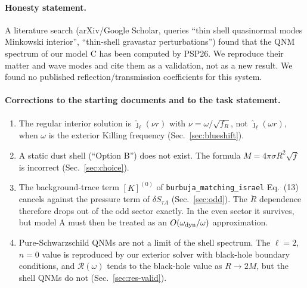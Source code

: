 \documentclass[11pt,a4paper]{article}
\numberwithin{equation}{section}
\newcommand{\sq}{\sqrt{f_R}}
\newcommand{\jh}{\hat\jmath_\ell}
\begin{document}
\paragraph{Honesty statement.} A literature search (arXiv/Google Scholar, queries ``thin shell
quasinormal modes Minkowski interior'', ``thin-shell gravastar perturbations'') found that the QNM spectrum
of our model C has been computed by PSP26. We reproduce their matter and wave modes and cite them as a
validation, not as a new result. We found no published reflection/transmission coefficients for this
system.

\paragraph{Corrections to the starting documents and to the task statement.}
\begin{enumerate}
\item The regular interior solution is $\jh(\nu r)$ with $\nu=\omega/\sq$, not $\jh(\omega r)$, when $\omega$
  is the exterior Killing frequency (Sec.~\ref{sec:blueshift}).
\item A static dust shell (``Option B'') does not exist. The formula $M=4\pi\sigma R^2\sqrt f$ is incorrect
  (Sec.~\ref{sec:choice}).
\item The background-trace term $[K]^{(0)}$ of \texttt{burbuja\_matching\_israel} Eq.~(13) cancels against the
  pressure term of $\delta S_{\tau A}$ (Sec.~\ref{sec:odd}). The $\ddot R$ dependence therefore drops out of the
  odd sector exactly. In the even sector it survives, but model A must then be treated as an
  $O(\omega_{\rm dyn}/\omega)$ approximation.
\item Pure-Schwarzschild QNMs are not a limit of the shell spectrum. The $\ell=2$, $n=0$ value is reproduced by
  our exterior solver with black-hole boundary conditions, and $\mathcal R(\omega)$ tends to the black-hole value
  as $R\to2M$, but the shell QNMs do not (Sec.~\ref{sec:res-valid}).
\end{enumerate}

\appendix
\end{document}
